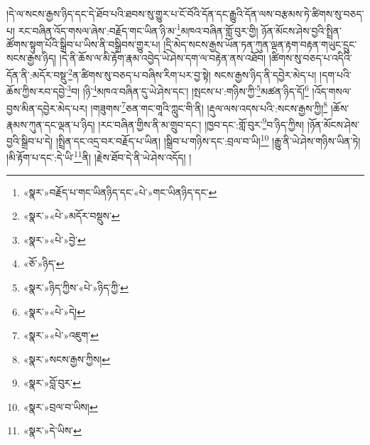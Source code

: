 །དེ་ལ་སངས་རྒྱས་ཉིད་དང་དེ་ཐོབ་པའི་ཐབས་སུ་གྱུར་པ་ངོ་བོའི་དོན་དང་རྒྱུའི་དོན་ལས་བརྩམས་ཏེ་ཚིགས་སུ་བཅད་པ། རང་བཞིན་འོད་གསལ་ཞེས་:བརྗོད་གང་ཡིན་ཉི་མ་\footnote{«སྣར་»བརྗོད་པ་གང་ཡིནཉིད་དང་«པེ་»གང་ཡིནཉིད་དང་}མཁའ་བཞིན་གློ་བུར་གྱི། ཉོན་མོངས་ཤེས་བྱའི་སྤྲིན་ཚོགས་སྟུག་པོའི་སྒྲིབ་པ་ཡིས་ནི་བསྒྲིབས་གྱུར་པ། །དྲི་མེད་སངས་རྒྱས་ཡོན་ཏན་ཀུན་ལྡན་རྟག་བརྟན་གཡུང་དྲུང་སངས་རྒྱས་ཉིད། །དེ་ནི་ཆོས་ལ་མི་རྟོག་རྣམ་འབྱེད་ཡེ་ཤེས་དག་ལ་བརྟེན་ནས་འཐོབ། །ཚིགས་སུ་བཅད་པ་འདིའི་དོན་ནི་:མདོར་བསྡུ་\footnote{«སྣར་»«པེ་»མདོར་བསྡུས་}ན་ཚིགས་སུ་བཅད་པ་བཞིས་རིག་པར་བྱ་སྟེ། སངས་རྒྱས་ཉིད་ནི་དབྱེར་མེད་པ། །དག་པའི་ཆོས་ཀྱིས་རབ་དབྱེ་\footnote{«སྣར་»«པེ་»བྱེ་}བ། །ཉི་\footnote{«ཅོ་»ཉིད་}མཁའ་བཞིན་དུ་ཡེ་ཤེས་དང་། །སྤངས་པ་:གཉིས་ཀྱི་\footnote{«སྣར་»ཉིད་ཀྱིས་«པེ་»ཉིད་ཀྱི་}མཚན་ཉིད་དོ།\footnote{«སྣར་»«པེ་»དེ།} །འོད་གསལ་བྱས་མིན་དབྱེར་མེད་པར། །གཟུགས་\footnote{«སྣར་»«པེ་»འཇུག་}ཅན་གང་གཱའི་ཀླུང་གི་ནི། །རྡུལ་ལས་འདས་པའི་:སངས་རྒྱས་ཀྱི།\footnote{«སྣར་»སངས་རྒྱས་ཀྱིས།} །ཆོས་རྣམས་ཀུན་དང་ལྡན་པ་ཉིད། །རང་བཞིན་གྱིས་ནི་མ་གྲུབ་དང་། །ཁྱབ་དང་:གློ་བུར་\footnote{«སྣར་»བློ་བུར་}བ་ཉིད་ཀྱིས། །ཉོན་མོངས་ཤེས་བྱའི་སྒྲིབ་པ་དེ། །སྤྲིན་དང་འདྲ་བར་བརྗོད་པ་ཡིན། །སྒྲིབ་པ་གཉིས་དང་:བྲལ་བ་ཡི།\footnote{«སྣར་»བྲལ་བ་ཡིས།} །རྒྱུ་ནི་ཡེ་ཤེས་གཉིས་ཡིན་ཏེ། །མི་རྟོག་པ་དང་:དེ་ཡི་\footnote{«སྣར་»དེ་ཡིས་}ནི། །རྗེས་ཐོབ་དེ་ནི་ཡེ་ཤེས་འདོད། །
